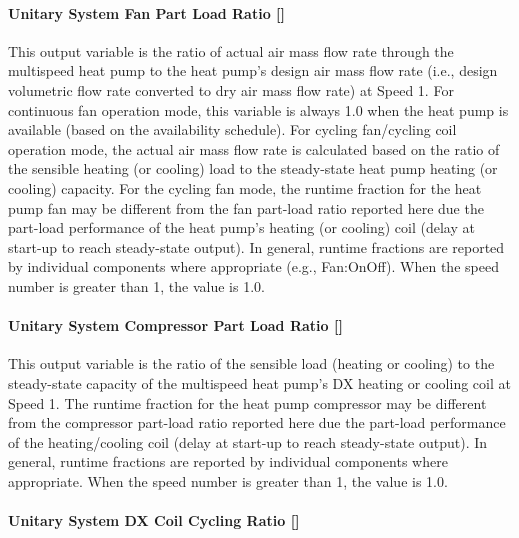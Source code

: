 \paragraph{\texorpdfstring{Unitary System Fan Part Load Ratio {[]}}{Unitary System Fan Part Load Ratio }}\label{unitary-system-fan-part-load-ratio-4}

This output variable is the ratio of actual air mass flow rate through the multispeed heat pump to the heat pump's design air mass flow rate (i.e., design volumetric flow rate converted to dry air mass flow rate) at Speed 1. For continuous fan operation mode, this variable is always 1.0 when the heat pump is available (based on the availability schedule). For cycling fan/cycling coil operation mode, the actual air mass flow rate is calculated based on the ratio of the sensible heating (or cooling) load to the steady-state heat pump heating (or cooling) capacity. For the cycling fan mode, the runtime fraction for the heat pump fan may be different from the fan part-load ratio reported here due the part-load performance of the heat pump's heating (or cooling) coil (delay at start-up to reach steady-state output). In general, runtime fractions are reported by individual components where appropriate (e.g., Fan:OnOff). When the speed number is greater than 1, the value is 1.0.

\paragraph{\texorpdfstring{Unitary System Compressor Part Load Ratio {[]}}{Unitary System Compressor Part Load Ratio }}\label{unitary-system-compressor-part-load-ratio-3}

This output variable is the ratio of the sensible load (heating or cooling) to the steady-state capacity of the multispeed heat pump's DX heating or cooling coil at Speed 1. The runtime fraction for the heat pump compressor may be different from the compressor part-load ratio reported here due the part-load performance of the heating/cooling coil (delay at start-up to reach steady-state output). In general, runtime fractions are reported by individual components where appropriate. When the speed number is greater than 1, the value is 1.0.

\paragraph{\texorpdfstring{Unitary System DX Coil Cycling Ratio {[]}}{Unitary System DX Coil Cycling Ratio }}\label{unitary-system-dx-coil-cycling-ratio-1}

